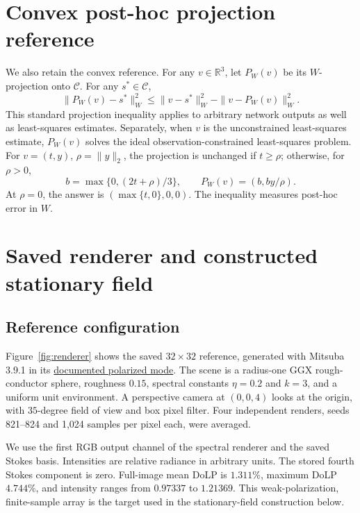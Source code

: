 \section{Convex post-hoc projection reference}
We also retain the convex reference. For any $v\in\mathbb R^3$, let $P_W(v)$ be its $W$-projection onto $\mathcal C$. For any $s^*\in\mathcal C$,
\begin{equation}
 \|P_W(v)-s^*\|_W^2\leq\|v-s^*\|_W^2-\|v-P_W(v)\|_W^2.
 \label{eq:projbound}
\end{equation}
This standard projection inequality \cite{prox} applies to arbitrary network outputs as well as least-squares estimates. Separately, when $v$ is the unconstrained least-squares estimate, $P_W(v)$ solves the ideal observation-constrained least-squares problem. For $v=(t,y)$, $\rho=\|y\|_2$, the projection is unchanged if $t\geq\rho$; otherwise, for $\rho>0$,
\begin{equation}
 b=\max\{0,(2t+\rho)/3\},\qquad P_W(v)=(b,by/\rho).
 \label{eq:weightedprojection}
\end{equation}
At $\rho=0$, the answer is $(\max\{t,0\},0,0)$. The inequality measures post-hoc error in $W$.


\section{Saved renderer and constructed stationary field}
\subsection{Reference configuration}
Figure~\ref{fig:renderer} shows the saved $32\times32$ reference, generated with Mitsuba 3.9.1 in its \href{https://mitsuba.readthedocs.io/en/latest/src/rendering/polarized_rendering.html}{documented polarized mode}. The scene is a radius-one GGX rough-conductor sphere, roughness $0.15$, spectral constants $\eta=0.2$ and $k=3$, and a uniform unit environment. A perspective camera at $(0,0,4)$ looks at the origin, with $35$-degree field of view and box pixel filter. Four independent renders, seeds 821--824 and 1,024 samples per pixel each, were averaged.

We use the first RGB output channel of the spectral renderer and the saved Stokes basis. Intensities are relative radiance in arbitrary units. The stored fourth Stokes component is zero. Full-image mean DoLP is $1.311\%$, maximum DoLP $4.744\%$, and intensity ranges from $0.97337$ to $1.21369$. This weak-polarization, finite-sample array is the target used in the stationary-field construction below.

